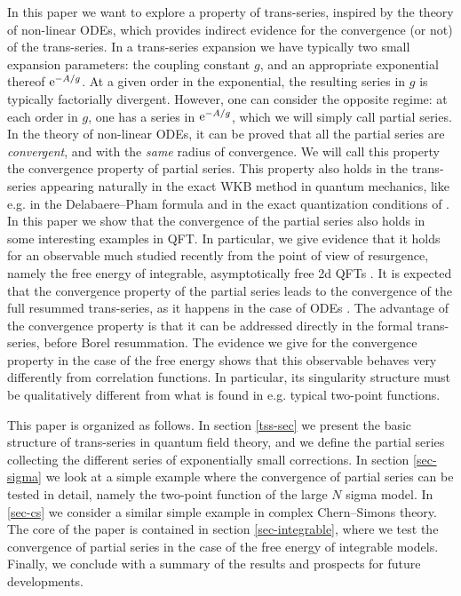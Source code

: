 \documentclass[a4paper,11pt]{article}
\theoremstyle{definition}
\newcommand{\re}{{\rm e}}
\begin{document}
In this paper we want to explore a property of trans-series, inspired by the theory of non-linear ODEs, 
which provides indirect evidence for the convergence (or not) of the trans-series. In a trans-series expansion we have typically 
two small expansion parameters: the coupling constant $g$, and an appropriate exponential thereof 
$\re^{-A/g}$. At a given order in the exponential, the resulting series in $g$ is typically 
factorially divergent. However, one can 
consider the opposite regime: at each order in $g$, one has a series in 
$\re^{-A/g}$, which we will simply call partial series. In the theory of non-linear ODEs, it can be proved 
\cite{costin-costin} that all the partial series are {\it convergent}, and with the {\it same} radius of convergence. We will 
call this property the convergence property of partial series. This property also holds in the trans-series appearing naturally 
in the exact WKB method in quantum mechanics, like e.g. in the 
Delabaere--Pham formula \cite{voros-quartic,dpham} and in the exact quantization conditions of \cite{voros,ddpham}. 
In this paper we show that the convergence of the partial series also 
holds in some interesting examples in QFT. In particular, we give evidence that it holds for 
an observable much studied recently from the point of view of resurgence, namely the free 
energy of integrable, asymptotically free 2d QFTs \cite{fkw-letter,fkw, volin, mr-ren, abbh1, 
abbh2, mmr, dmss, mmr-an, bbv, bbhv, 
bbhv2, mmr-theta, bbv2,s-thompson}. It is expected that the convergence property of the partial series  
leads to the convergence of the full resummed trans-series, as it happens in the case of ODEs \cite{costin-costin}. 
The advantage of the convergence 
property is that it can be addressed directly in the formal trans-series, before 
Borel resummation. The evidence we give for the convergence property in the case of the 
free energy shows that this observable behaves very differently from correlation functions. In particular, 
its singularity structure must be qualitatively different from what is found in e.g. typical two-point functions. 







This paper is organized as follows. In section \ref{tss-sec} we present the basic 
structure of trans-series in quantum field theory, and we 
define the partial series collecting the different series of exponentially small corrections. In section \ref{sec-sigma} we 
look at a simple example where the convergence of partial series can be tested in detail, namely the two-point function 
of the large $N$ sigma model. In \ref{sec-cs} we consider a similar simple example in complex Chern--Simons theory. 
The core of the paper is contained in section \ref{sec-integrable}, where we test the convergence of partial series in 
the case of the free energy of integrable models. Finally, we conclude with a summary of the results and prospects for 
future developments. 
\end{document}
